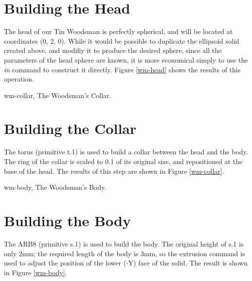 \section{Building the Head}

The head of our Tin Woodsman is perfectly spherical, and will be located
at coordinates (0, 2, 0).
While it would be possible to duplicate the ellipsoid solid created above,
and modifiy it to produce the desired sphere, since all the parameters
of the head sphere are known, it is more economical simply to use
the {\em in} command to construct it directly.
Figure \ref{wm-head} shows the results of this operation.


\mfig wm-collar, The Woodsman's Collar.
\section{Building the Collar}

The torus (primitive t.1) is used to build a collar between the head and
the body.
The ring of the collar is scaled to 0.1 of its original size,
and repositioned at the base of the head.
The results of this step are shown in Figure \ref{wm-collar}.


\mfig wm-body, The Woodsman's Body.
\section{Building the Body}

The ARB8 (primitive s.1) is used to build the body.
The original height of s.1 is only 2mm;  the required
length of the body is 3mm, so the extrusion command is
used to adjust the position of the lower (-Y) face of the solid.
The result is shown in Figure \ref{wm-body}.

